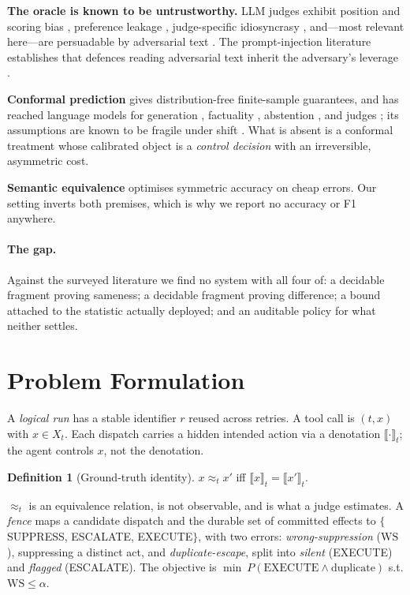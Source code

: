 \documentclass[10pt,twocolumn]{article}
\theoremstyle{definition}
\newtheorem{definition}{Definition}
\theoremstyle{remark}
\newcommand{\aeq}{\approx_t}
\begin{document}
\textbf{The oracle is known to be untrustworthy.} LLM judges exhibit position
and scoring bias \cite{ref70,ref74}, preference leakage \cite{ref73},
judge-specific idiosyncrasy \cite{ref72}, and---most relevant here---are
persuadable by adversarial text \cite{ref77,ref78}. The prompt-injection
literature establishes that defences reading adversarial text inherit the
adversary's leverage \cite{ref43,ref47}.

\textbf{Conformal prediction} \cite{ref1,ref2} gives distribution-free
finite-sample guarantees, and has reached language models for generation
\cite{ref91}, factuality \cite{ref92}, abstention \cite{ref95}, and judges
\cite{ref97}; its assumptions are known to be fragile under shift
\cite{ref98,ref99,ref111}. What is absent is a conformal treatment whose
calibrated object is a \emph{control decision} with an irreversible, asymmetric
cost.

\textbf{Semantic equivalence} \cite{ref118,ref13} optimises symmetric accuracy on
cheap errors. Our setting inverts both premises, which is why we report no
accuracy or F1 anywhere.

\paragraph{The gap.} Against the surveyed literature we find no system with all
four of: a decidable fragment proving sameness; a decidable fragment proving
difference; a bound attached to the statistic actually deployed; and an
auditable policy for what neither settles.

\section{Problem Formulation}
\label{sec:theory}

A \emph{logical run} has a stable identifier $r$ reused across retries. A tool
call is $(t,x)$ with $x \in X_t$. Each dispatch carries a hidden intended action
via a denotation $\llbracket \cdot \rrbracket_t$; the agent controls $x$, not
the denotation.

\begin{definition}[Ground-truth identity]
$x \aeq x'$ iff $\llbracket x \rrbracket_t = \llbracket x' \rrbracket_t$.
\end{definition}

$\aeq$ is an equivalence relation, is not observable, and is what a judge
estimates. A \emph{fence} maps a candidate dispatch and the durable set of
committed effects to $\{$SUPPRESS, ESCALATE, EXECUTE$\}$, with two errors:
\emph{wrong-suppression} ($\mathrm{WS}$), suppressing a distinct act, and
\emph{duplicate-escape}, split into \emph{silent} (EXECUTE) and \emph{flagged}
(ESCALATE). The objective is
$\min\ P(\text{EXECUTE} \wedge \text{duplicate})$ s.t. $\mathrm{WS} \leq \alpha$.
\end{document}
